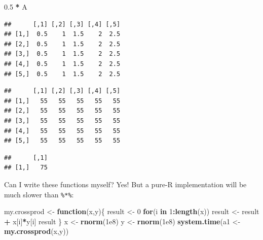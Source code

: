 \documentclass[]{book}
\newenvironment{Shaded}{\begin{snugshade}}{\end{snugshade}}
\newcommand{\CommentTok}[1]{\textcolor[rgb]{0.56,0.35,0.01}{\textit{#1}}}
\newcommand{\ControlFlowTok}[1]{\textcolor[rgb]{0.13,0.29,0.53}{\textbf{#1}}}
\newcommand{\DecValTok}[1]{\textcolor[rgb]{0.00,0.00,0.81}{#1}}
\newcommand{\FloatTok}[1]{\textcolor[rgb]{0.00,0.00,0.81}{#1}}
\newcommand{\KeywordTok}[1]{\textcolor[rgb]{0.13,0.29,0.53}{\textbf{#1}}}
\newcommand{\NormalTok}[1]{#1}
\newcommand{\OperatorTok}[1]{\textcolor[rgb]{0.81,0.36,0.00}{\textbf{#1}}}
\newcommand{\StringTok}[1]{\textcolor[rgb]{0.31,0.60,0.02}{#1}}
\theoremstyle{definition}
\theoremstyle{definition}
\theoremstyle{definition}
\theoremstyle{remark}
\begin{document}
\begin{Shaded}
\begin{Highlighting}[]
\FloatTok{0.5} \OperatorTok{*}\StringTok{ }\NormalTok{A }
\end{Highlighting}
\end{Shaded}

\begin{verbatim}
##      [,1] [,2] [,3] [,4] [,5]
## [1,]  0.5    1  1.5    2  2.5
## [2,]  0.5    1  1.5    2  2.5
## [3,]  0.5    1  1.5    2  2.5
## [4,]  0.5    1  1.5    2  2.5
## [5,]  0.5    1  1.5    2  2.5
\end{verbatim}

\begin{Shaded}
\end{Shaded}

\begin{verbatim}
##      [,1] [,2] [,3] [,4] [,5]
## [1,]   55   55   55   55   55
## [2,]   55   55   55   55   55
## [3,]   55   55   55   55   55
## [4,]   55   55   55   55   55
## [5,]   55   55   55   55   55
\end{verbatim}

\begin{Shaded}
\end{Shaded}

\begin{verbatim}
##      [,1]
## [1,]   75
\end{verbatim}

Can I write these functions myself? Yes!
But a pure-R implementation will be much slower than \texttt{\%*\%}:

\begin{Shaded}
\begin{Highlighting}[]
\NormalTok{my.crossprod <-}\StringTok{ }\ControlFlowTok{function}\NormalTok{(x,y)\{}
\NormalTok{  result <-}\StringTok{ }\DecValTok{0}
  \ControlFlowTok{for}\NormalTok{(i }\ControlFlowTok{in} \DecValTok{1}\OperatorTok{:}\KeywordTok{length}\NormalTok{(x)) result <-}\StringTok{ }\NormalTok{result }\OperatorTok{+}\StringTok{ }\NormalTok{x[i]}\OperatorTok{*}\NormalTok{y[i]}
\NormalTok{  result}
\NormalTok{\}}
\NormalTok{x <-}\StringTok{ }\KeywordTok{rnorm}\NormalTok{(}\FloatTok{1e8}\NormalTok{)}
\NormalTok{y <-}\StringTok{ }\KeywordTok{rnorm}\NormalTok{(}\FloatTok{1e8}\NormalTok{)}
\KeywordTok{system.time}\NormalTok{(a1 <-}\StringTok{ }\KeywordTok{my.crossprod}\NormalTok{(x,y))}
\end{Highlighting}
\end{Shaded}
\end{document}
